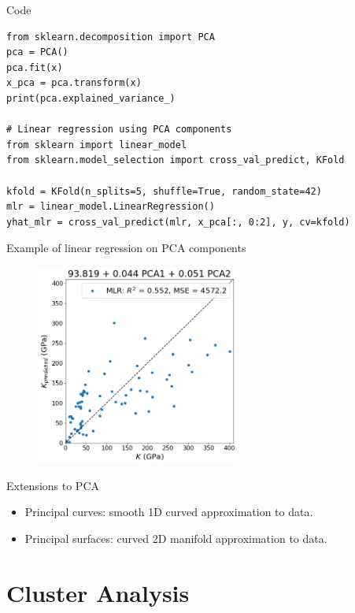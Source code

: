 \documentclass[aspectratio=169]{beamer}
\begin{document}
\begin{frame}[fragile]{Code}
\begin{verbatim}
from sklearn.decomposition import PCA
pca = PCA()
pca.fit(x)
x_pca = pca.transform(x)
print(pca.explained_variance_)

# Linear regression using PCA components
from sklearn import linear_model
from sklearn.model_selection import cross_val_predict, KFold

kfold = KFold(n_splits=5, shuffle=True, random_state=42)
mlr = linear_model.LinearRegression()
yhat_mlr = cross_val_predict(mlr, x_pca[:, 0:2], y, cv=kfold)
\end{verbatim}
\end{frame} 


\begin{frame}{Example of linear regression on PCA components}
\begin{figure}
    \centering
    \includegraphics[width=0.6\textwidth]{figures/pca-regression.png}
\end{figure}
\end{frame} 

\begin{frame}{Extensions to PCA}
    \begin{itemize}
        \item Principal curves: smooth 1D curved approximation to data.
        \item Principal surfaces: curved 2D manifold approximation to data.
    \end{itemize}
\end{frame}

\section{Cluster Analysis}
\end{document}
